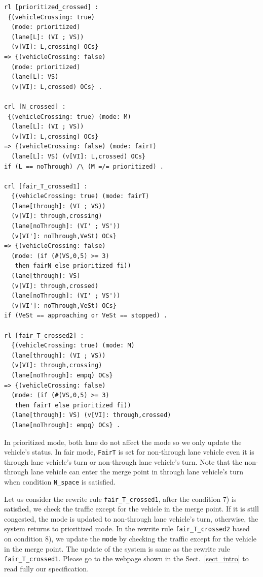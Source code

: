 \documentclass[10pt, conference, compsocconf]{IEEEtran}
\begin{document}
\begin{small}
  \begin{verbatim}
rl [prioritized_crossed] : 
 {(vehicleCrossing: true) 
  (mode: prioritized) 
  (lane[L]: (VI ; VS)) 
  (v[VI]: L,crossing) OCs} 
=> {(vehicleCrossing: false) 
  (mode: prioritized) 
  (lane[L]: VS) 
  (v[VI]: L,crossed) OCs} .

crl [N_crossed] : 
 {(vehicleCrossing: true) (mode: M) 
  (lane[L]: (VI ; VS)) 
  (v[VI]: L,crossing) OCs} 
=> {(vehicleCrossing: false) (mode: fairT) 
  (lane[L]: VS) (v[VI]: L,crossed) OCs} 
if (L == noThrough) /\ (M =/= prioritized) .

crl [fair_T_crossed1] : 
  {(vehicleCrossing: true) (mode: fairT) 
  (lane[through]: (VI ; VS)) 
  (v[VI]: through,crossing) 
  (lane[noThrough]: (VI' ; VS')) 
  (v[VI']: noThrough,VeSt) OCs} 
=> {(vehicleCrossing: false) 
  (mode: (if (#(VS,0,5) >= 3) 
   then fairN else prioritized fi))
  (lane[through]: VS) 
  (v[VI]: through,crossed)
  (lane[noThrough]: (VI' ; VS')) 
  (v[VI']: noThrough,VeSt) OCs} 
if (VeSt == approaching or VeSt == stopped) .

rl [fair_T_crossed2] : 
  {(vehicleCrossing: true) (mode: M)
  (lane[through]: (VI ; VS)) 
  (v[VI]: through,crossing) 
  (lane[noThrough]: empq) OCs} 
=> {(vehicleCrossing: false) 
  (mode: (if (#(VS,0,5) >= 3) 
   then fairT else prioritized fi))
  (lane[through]: VS) (v[VI]: through,crossed) 
  (lane[noThrough]: empq) OCs} .    
  \end{verbatim}
\end{small}
 
In prioritized mode, both lane do not affect the mode so we only
update the vehicle's status.
In fair mode, \verb!FairT! is set for non-through lane vehicle even 
it is through lane vehicle's turn or non-through lane vehicle's turn.
Note that the non-through lane vehicle can enter the merge point in 
through lane vehicle's turn when condition \verb!N_space! is satisfied.

Let us consider the rewrite rule \verb!fair_T_crossed1!, after the condition
7) is satisfied, we check the traffic except for the vehicle in the merge point.
If it is still congested, the mode is updated to non-through lane vehicle's turn,
otherwise, the system returns to prioritized mode. In the rewrite rule 
\verb!fair_T_crossed2! based on condition 8), we update the \verb!mode! by checking the 
traffic except for the vehicle in the merge point.
The update of the system is same as the rewrite rule \verb!fair_T_crossed1!.
Please go to the webpage shown in the Sect.~\ref{sect_intro} to read fully our specification.
 
\end{document}
